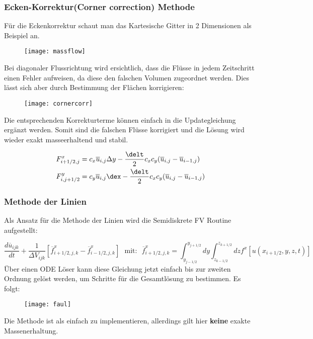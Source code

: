 \subsubsection{Ecken-Korrektur(Corner correction) Methode}
F\"ur die Eckenkorrektur schaut man das Kartesische Gitter in 2 Dimensionen als Beispiel an.
\par
\begin{figure}[ht]
	\centering
	\texttt{[image: massflow]}
\end{figure}
Bei diagonaler Flussrichtung wird ersichtlich, dass die Fl\"usse in jedem Zeitschritt einen Fehler aufweisen, da diese den falschen Volumen zugeordnet werden. Dies l\"asst sich aber durch Bestimmung der Fl\"achen korrigieren:
\par
\begin{figure}[ht]
	\centering
	\texttt{[image: cornercorr]}
\end{figure}
Die entsprechenden Korrekturterme k\"onnen einfach in die Updategleichung erg\"anzt werden. Somit sind die falschen Fl\"usse korrigiert und die L\"osung wird wieder exakt masseerhaltend und stabil.
\par
\begin{align*}
	F^x_{i+1/2,j} &= c_x \overline{u}_{i,j} \Delta y - \frac{\delt}{2}c_xc_y(\overline{u}_{i,j} - \overline{u}_{i-1,j}) \\
	F^y_{i,j+1/2} &= c_y\overline{u}_{i,j}\dex - \frac{\delt}{2}c_xc_y(\overline{u}_{i,j} - \overline{u}_{i-1,j})
\end{align*}

\subsubsection{Methode der Linien}
Als Ansatz f\"ur die Methode der Linien wird die Semidiskrete FV Routine aufgestellt:
\par
\begin{equation*}
	\frac{d\overline{u}_{ijk}}{dt} + \frac{1}{\Delta V_{ijk}}[\overline{f}^x_{i+1/2,j,k} - \overline{f}^x_{i-1/2,j,k}]~~~\textrm{mit:}~~~ \overline{f}^x_{i+1/2,j,k} = \int_{y_{j-1/2}}^{y_{j+1/2}}dy \int_{z_{k-1/2}}^{z_{k+1/2}}dz f^x[u(x_{i+1/2},y,z,t)]
\end{equation*}
\"Uber einen ODE L\"oser kann diese Gleichung jetzt einfach bis zur zweiten Ordnung gel\"ost werden, um Schritte f\"ur die Gesamtl\"osung zu bestimmen. Es folgt:
\begin{figure}[ht]
	\centering
	\texttt{[image: faul]}
\end{figure}
\par
Die Methode ist als einfach zu implementieren, allerdings gilt hier \textbf{keine} exakte Massenerhaltung.

